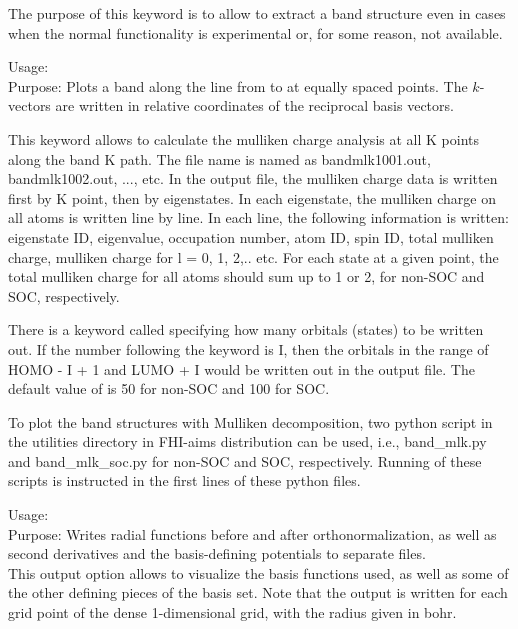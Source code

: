 The purpose of this keyword is to allow to extract a band structure
even in cases when the normal
 functionality is
experimental or, for some reason, not available.


{
	Usage:   \\[1.0ex]
	Purpose: Plots a band along the line from
	 to
	 at  equally
	spaced points. The $k$-vectors are written in relative
	coordinates of the reciprocal basis vectors. \\
}

This keyword allows to calculate the mulliken charge analysis at all K points along the band K path. The file name is named as bandmlk1001.out, bandmlk1002.out, ..., etc. In the output file, the mulliken charge data is written first by K point, then by eigenstates. In each eigenstate, the mulliken charge on all atoms is written line by line. In each line, the following information is written: eigenstate ID, eigenvalue, occupation number, atom ID, spin ID, total mulliken charge, mulliken charge for l = 0, 1, 2,.. etc. For each state at a given point, the total mulliken charge for all atoms should sum up to 1 or 2, for non-SOC and SOC, respectively.

There is a keyword called  specifying how many orbitals (states) to be written out. If the number following the keyword  is I, then the orbitals in the range of HOMO - I + 1 and LUMO + I would be written out in the output file. The default value of  is 50 for non-SOC and 100 for SOC.

To plot the band structures with Mulliken decomposition, two python script in the utilities directory in FHI-aims distribution can be used,
i.e., band\_mlk.py and band\_mlk\_soc.py for non-SOC and SOC, respectively. Running of these scripts is instructed in the first lines of these python files.

{
  \noindent
  Usage:   \\[1.0ex]
  Purpose: Writes radial functions before and after
    orthonormalization, as well as second derivatives and the
    basis-defining potentials to separate files. \\[1.0ex]
}
This output option allows to visualize the basis functions used, as
well as some of the other defining pieces of the basis set. Note
that the output is written for each grid point of the dense
1-dimensional  grid, with the radius
given in bohr.

